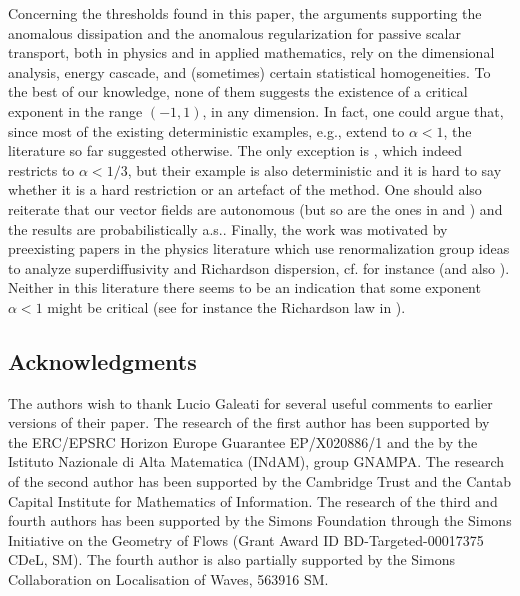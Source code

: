\documentclass[11pt,reqno]{amsart}
\theoremstyle{definition}
\numberwithin{equation}{section}
\begin{document}
Concerning the thresholds found in this paper, the arguments supporting the anomalous dissipation and the anomalous regularization for passive scalar transport, both in physics and in applied mathematics, rely on the dimensional analysis, energy cascade, and (sometimes) certain statistical homogeneities. To the best of our knowledge, none of them suggests the existence of a critical exponent in the range $(-1,1)$, in any dimension. In fact, one could argue that, since most of the existing deterministic examples, e.g., \cite{DrivasElgindiIyerJeong2019, ColomboCrippaSorella2023, JohanssonSorella2023} extend to $\alpha<1$, the literature so far suggested otherwise. The only exception is \cite{ArmstrongVicol2024}, which indeed restricts to $\alpha < 1/3$, but their example is also deterministic and it is hard to say whether it is a hard restriction or an artefact of the method. One should also reiterate that our vector fields are autonomous (but so are the ones in \cite{ArmstrongBouRabeeKuusi2026} and \cite{JohanssonSorella2023}) and the results are probabilistically a.s.. Finally, the work \cite{ArmstrongBouRabeeKuusi2026} was motivated by preexisting papers in the physics literature which use renormalization group ideas to analyze superdiffusivity and Richardson dispersion, cf. for instance \cite{BouchaudGeorges} (and also \cite{BouchaudComtetGeorgesLeDoussal1987,KonkonenKarjalainen1988}). Neither in this literature there seems to be an indication that some exponent $\alpha<1$ might be critical (see for instance the Richardson law in \cite[p. 216]{BouchaudGeorges}).

\subsection{Acknowledgments} The authors wish to thank Lucio Galeati for several useful comments to earlier versions of their paper. The research of the first author has been supported by the ERC/{\allowbreak}EPSRC Horizon Europe Guarantee EP/X020886/1 and the by the Istituto Nazionale di Alta Matematica (INdAM), group GNAMPA. The research of the second author has been supported by the Cambridge Trust and the Cantab Capital Institute for Mathematics of Information. The research of the third and fourth authors has been supported by the Simons Foundation through the Simons Initiative on the Geometry of Flows (Grant Award ID BD-Targeted-00017375 CDeL, SM). The fourth author is also partially supported by the Simons Collaboration on Localisation of Waves, 563916 SM. 
\end{document}
